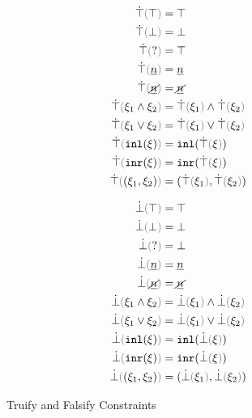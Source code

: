 \begin{figure}[ht]
\noindent\begin{minipage}{.5\linewidth}
\begin{align*}
  \ctruify{\ctruth} &= \ctruth \\
  \ctruify{\cfalsity} &= \cfalsity \\
  \ctruify{\cunknown} &= \ctruth \\
  \ctruify{\cnum{n}} &= \cnum{n} \\
  \ctruify{\cnotnum{n}} &= \cnotnum{n} \\
  \ctruify{\cand{\xi_1}{\xi_2}} &= \cand{\ctruify{\xi_1}}{\ctruify{\xi_2}} \\
  \ctruify{\cor{\xi_1}{\xi_2}} &= \cor{\ctruify{\xi_1}}{\ctruify{\xi_2}} \\
  \ctruify{\cinl{\xi}} &= \cinl{\ctruify{\xi}} \\
  \ctruify{\cinr{\xi}} &= \cinr{\ctruify{\xi}} \\
  \ctruify{\cpair{\xi_1}{\xi_2}} &= \cpair{\ctruify{\xi_1}}{\ctruify{\xi_2}}
\end{align*}
\end{minipage}%
\begin{minipage}{.5\linewidth}
\begin{align*}
  \cfalsify{\ctruth} &= \ctruth \\
  \cfalsify{\cfalsity} &= \cfalsity \\
  \cfalsify{\cunknown} &= \cfalsity \\
  \cfalsify{\cnum{n}} &= \cnum{n} \\
  \cfalsify{\cnotnum{n}} &= \cnotnum{n} \\
  \cfalsify{\cand{\xi_1}{\xi_2}} &= \cand{\cfalsify{\xi_1}}{\cfalsify{\xi_2}} \\
  \cfalsify{\cor{\xi_1}{\xi_2}} &= \cor{\cfalsify{\xi_1}}{\cfalsify{\xi_2}} \\
  \cfalsify{\cinl{\xi}} &= \cinl{\cfalsify{\xi}} \\
  \cfalsify{\cinr{\xi}} &= \cinr{\cfalsify{\xi}} \\
  \cfalsify{\cpair{\xi_1}{\xi_2}} &= \cpair{\cfalsify{\xi_1}}{\cfalsify{\xi_2}}
\end{align*}
\end{minipage}
  \caption{Truify and Falsify Constraints}
  \label{fig:truify-falsify}
\end{figure}